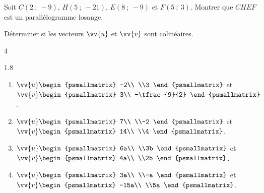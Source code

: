 \documentclass[main.tex]{subfiles}
\begin{document}
\begin{exercise}[entrainement] Soit $C(2\ ;\ -9)$, $H(5\ ;\ -21)$, $E(8\ ;\ -9)$ et $F\left(5\ ;\ 3\right)$. Montrer que $CHEF$ est un parallélogramme losange.
\end{exercise}
\begin{exercise}[révision] Déterminer si les vecteurs $\vv{u}$ et $\vv{v}$ sont colinéaires.
	\vspace{-0.5em}
	\begin{multicols}{4}
		\begin{spacing}{1.8}
			\begin{enumerate}[label=\arabic*),leftmargin=*]
				\item  $ \vv{u}
				\displaystyle\begin{psmallmatrix}
					-2\\ \\3
				\end{psmallmatrix}$ et $\vv{v}\begin{psmallmatrix}
					3\\ -\tfrac{9}{2}
				\end{psmallmatrix}$. 
				\item  $ \vv{u}
				\displaystyle\begin{psmallmatrix}
					7\\ \\-2
				\end{psmallmatrix}$ et $\vv{v}\begin{psmallmatrix}
					14\\ \\4
				\end{psmallmatrix}$. 
				\item  $ \vv{u}
				\displaystyle\begin{psmallmatrix}
					6a\\ \\3b
				\end{psmallmatrix}$ et $\vv{v}\begin{psmallmatrix}
					4a\\ \\2b
				\end{psmallmatrix}$. 
				\item  $ \vv{u}
				\displaystyle\begin{psmallmatrix}
					3a\\ \\-a
				\end{psmallmatrix}$ et $\vv{v}\begin{psmallmatrix}
					-15a\\ \\5a
				\end{psmallmatrix}$. 
			\end{enumerate}	
		\end{spacing}
	\end{multicols} 
\vspace{-0.5em}
\end{exercise}
\end{document}
